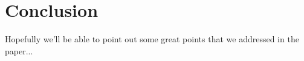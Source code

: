 
\section{Conclusion}
\label{sec:conclusion}

Hopefully we'll be able to point out some great points that we addressed in the paper...


